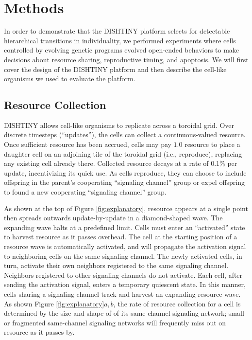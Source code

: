 \section{Methods}

In order to demonstrate that the DISHTINY platform selects for detectable hierarchical transitions in individuality, we performed experiments where cells controlled by evolving genetic programs evolved open-ended behaviors to make decisions about resource sharing, reproductive timing, and apoptosis.
We will first cover the design of the DISHTINY platform and then describe the cell-like organisms we used to evaluate the platform.

\subsection{Resource Collection}



DISHTINY allows cell-like organisms to replicate across a toroidal grid.
Over discrete timesteps (``updates''), the cells can collect a continuous-valued resource.
Once sufficient resource has been accrued, cells may pay $1.0$ resource to place a daughter cell on an adjoining tile of the toroidal grid (i.e., reproduce), replacing any existing cell already there.
Collected resource decays at a rate of 0.1\% per update, incentivizing its quick use.
As cells reproduce, they can choose to include offspring in the parent's cooperating ``signaling channel'' group or expel offspring to found a new cooperating ``signaling channel'' group.

As shown at the top of Figure \ref{fig:explanatory}, resource appears at a single point then spreads outwards update-by-update in a diamond-shaped wave. The expanding wave halts at a predefined limit.
Cells must enter an ``activated'' state to harvest resource as it passes overhead.
The cell at the starting position of a resource wave is automatically activated, and will propagate the activation signal to neighboring cells on the same signaling channel.
The newly activated cells, in turn, activate their own neighbors registered to the same signaling channel.
Neighbors registered to other signaling channels do not activate.
Each cell, after sending the activation signal, enters a temporary quiescent state.
In this manner, cells sharing a signaling channel track and harvest an expanding resource wave.
As shown Figure \ref{fig:explanatory}$a,b$, the rate of resource collection for a cell is determined by the size and shape of of its same-channel signaling network;
small or fragmented same-channel signaling networks will frequently miss out on resource as it passes by.

